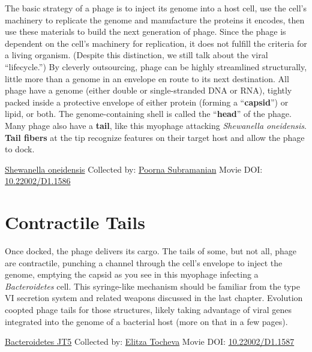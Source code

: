 \documentclass[]{tufte-book}
\begin{document}
The basic strategy of a phage is to inject its genome into a host cell, use the cell's machinery to replicate the genome and manufacture the proteins it encodes, then use these materials to build the next generation of phage. Since the phage is dependent on the cell's machinery for replication, it does not fulfill the criteria for a living organism. (Despite this distinction, we still talk about the viral ``lifecycle.'') By cleverly outsourcing, phage can be highly streamlined structurally, little more than a genome in an envelope en route to its next destination. All phage have a genome (either double or single-stranded DNA or RNA), tightly packed inside a protective envelope of either protein (forming a ``\textbf{capsid}'') or lipid, or both. The genome-containing shell is called the ``\textbf{head}'' of the phage. Many phage also have a \textbf{tail}, like this myophage attacking \emph{Shewanella oneidensis}. \textbf{Tail fibers} at the tip recognize features on their target host and allow the phage to dock.



\hypertarget{htmlwidget-bd595a89656b7b03a9ac}{}

\label{fig:10-1}\protect\hyperlink{tree}{Shewanella oneidensis} Collected by: \protect\hyperlink{poorna_subramanian}{Poorna Subramanian} Movie DOI: \href{https://doi.org/10.22002/D1.1586}{10.22002/D1.1586}

\hypertarget{contractile-tails}{%
\section{Contractile Tails}\label{contractile-tails}}

Once docked, the phage delivers its cargo. The tails of some, but not all, phage are contractile, punching a channel through the cell's envelope to inject the genome, emptying the capsid as you see in this myophage infecting a \emph{Bacteroidetes} cell. This syringe-like mechanism should be familiar from the type VI secretion system and related weapons discussed in the last chapter. Evolution coopted phage tails for those structures, likely taking advantage of viral genes integrated into the genome of a bacterial host (more on that in a few pages).



\hypertarget{htmlwidget-029c860a7a1bc503a50f}{}

\label{fig:10-2}\protect\hyperlink{tree}{Bacteroidetes JT5} Collected by: \protect\hyperlink{elitza_tocheva}{Elitza Tocheva} Movie DOI: \href{https://doi.org/10.22002/D1.1587}{10.22002/D1.1587}
\end{document}
